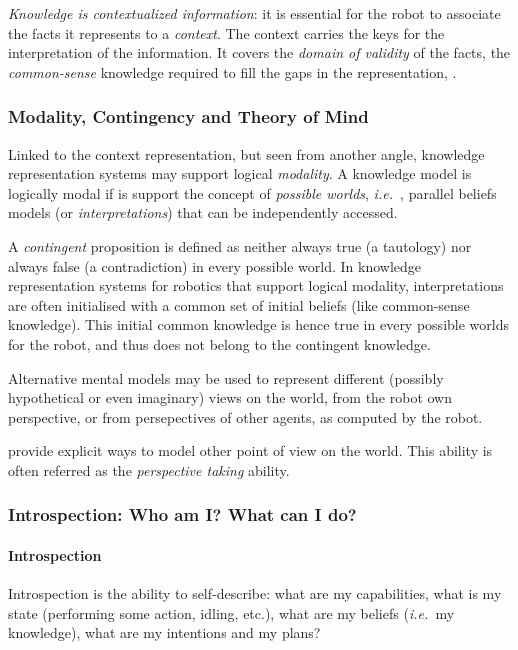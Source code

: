 \documentclass[a4paper, twocolumn]{article}
\newcommand{\ie}{{\textit{i.e.\ }}}
\begin{document}
\emph{Knowledge is contextualized information}: it is essential for the robot to associate the facts it
represents to a \emph{context}. The context carries the keys for the
interpretation of the information. It covers the \emph{domain of validity} of
the facts, the \emph{common-sense} knowledge required to fill the gaps in the
representation, .

\subsubsection{Modality, Contingency and Theory of Mind}
\label{sect|possible-worlds}

Linked to the context representation, but seen from another angle, knowledge
representation systems may support logical \emph{modality}. A knowledge model
is logically modal if is support the concept of \emph{possible worlds}, \ie,
parallel beliefs models (or \emph{interpretations}) that can be independently
accessed.

A \emph{contingent} proposition is defined as neither always true (a tautology)
nor always false (a contradiction) in every possible world. In knowledge
representation systems for robotics that support logical modality,
interpretations are often initialised with a common set of initial beliefs
(like common-sense knowledge). This initial common knowledge is hence true in
every possible worlds for the robot, and thus does not belong to the contingent
knowledge.

Alternative mental models may be used to represent different (possibly
hypothetical or even imaginary) views on the world, from the robot own
perspective, or from persepectives of other agents, as computed by the robot.

provide explicit ways to model other point of view
on the world. This ability is often referred as the \emph{perspective taking}
ability.


\subsubsection{Introspection: Who am I? What can I do?}
\label{sect|introspection}

\paragraph{Introspection}

Introspection is the ability to self-describe: what are my capabilities, what
is my state (performing some action, idling, etc.), what are my beliefs (\ie my
knowledge), what are my intentions and my plans?
\end{document}
